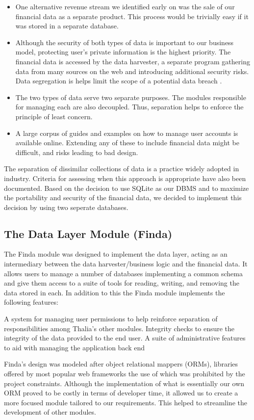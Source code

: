 \documentclass[main.tex]{subfiles}
\begin{document}
\begin{itemize}

\item One alternative revenue stream we identified early on was the sale of our financial data as a separate product. This process would be trivially easy if it was stored in a separate database. 
\item Although the security of both types of data is important to our business model, protecting user’s private information is the highest priority. The financial data is accessed by the data harvester, a separate program gathering data from many sources on the web and introducing additional security risks. Data segregation is helps limit the scope of a potential data breach \cite{ciscoSeg}.
\item The two types of data serve two separate purposes. The modules responsible for managing each are also decoupled. Thus, separation helps to enforce the principle of least concern.
\item A large corpus of guides and examples on how to manage user accounts is available online. Extending any of these to include financial data might be difficult, and risks leading to bad design.
\end{itemize}

The separation of dissimilar collections of data is a practice widely adopted in industry. Criteria for assessing when this approach is appropriate have also been documented. \cite{dataSegImp} Based on the decision to use SQLite as our DBMS and to maximize the portability and security of the financial data, we decided to implement this decision by using two seperate databases.

\subsection{The Data Layer Module (Finda)}

The Finda module was designed to implement the data layer, acting as an intermediary between the data harvester/business logic and the financial data. It allows users to manage a number of databases implementing a common schema and give them access to a suite of tools for reading, writing, and removing the data stored in each. In addition to this the Finda module implements the following features:

A system for managing user permissions to help reinforce separation of responsibilities among Thalia's other modules. 
Integrity checks to ensure the integrity of the data provided to the end user. 
A suite of administrative features to aid with managing the application back end

Finda's design was modeled after object relational mappers (ORMs), libraries offered by most popular web frameworks the use of which was prohibited by the project constraints. Although the implementation of what is essentially our own ORM proved to be costly in terms of developer time, it allowed us to create a more focused module tailored to our requirements. This helped to streamline the development of other modules.
\end{document}
